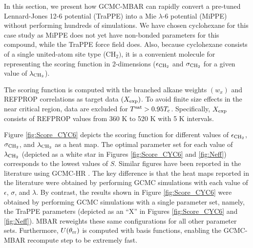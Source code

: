 \documentclass[journal=jced,manuscript=article]{achemso}
\begin{document}



In this section, we present how GCMC-MBAR can rapidly convert a pre-tuned Lennard-Jones 12-6 potential (TraPPE) into a Mie $\lambda$-6 potential (MiPPE) without performing hundreds of simulations. We have chosen cyclohexane for this case study as MiPPE does not yet have non-bonded parameters for this compound, while the TraPPE force field does. Also, because cyclohexane consists of a single united-atom site type (CH$_2)$, it is a convenient molecule for representing the scoring function in 2-dimensions ($\epsilon_{\rm CH_2}$ and $\sigma_{\rm CH_2}$ for a given value of $\lambda_{\rm CH_2}$). 

The scoring function is computed with the branched alkane weights $(w_{x})$ and REFPROP correlations as target data $(X_{\rm exp})$. To avoid finite size effects in the near critical region, data are excluded for $T^{\rm sat} > 0.95 T_{\rm c}$. Specifically, $X_{\rm exp}$ consists of REFPROP values from 360 K to 520 K with 5 K intervals.

Figure \ref{fig:Score_CYC6} depicts the scoring function for different values of $\epsilon_{\rm CH_2}$, $\sigma_{\rm CH_2}$, and $\lambda_{\rm CH_2}$ as a heat map. The optimal parameter set for each value of $\lambda_{\rm CH_2}$ (depicted as a white star in Figures \ref{fig:Score_CYC6} and \ref{fig:Neff}) corresponds to the lowest values of $S$. Similar figures have been reported in the literature using GCMC-HR \cite{Potoff_branched,Barhaghi2017}. The key difference is that the heat maps reported in the literature were obtained by performing GCMC simulations with each value of $\epsilon$, $\sigma$, and $\lambda$. By contrast, the results shown in Figure \ref{fig:Score_CYC6} were obtained by performing GCMC simulations with a single parameter set, namely, the TraPPE parameters (depicted as an ``X'' in Figures \ref{fig:Score_CYC6} and \ref{fig:Neff}). MBAR reweights these same configurations for all other parameter sets. Furthermore, $U(\theta_{\rm rr})$ is computed with basis functions, enabling the GCMC-MBAR recompute step to be extremely fast. 
\end{document}
